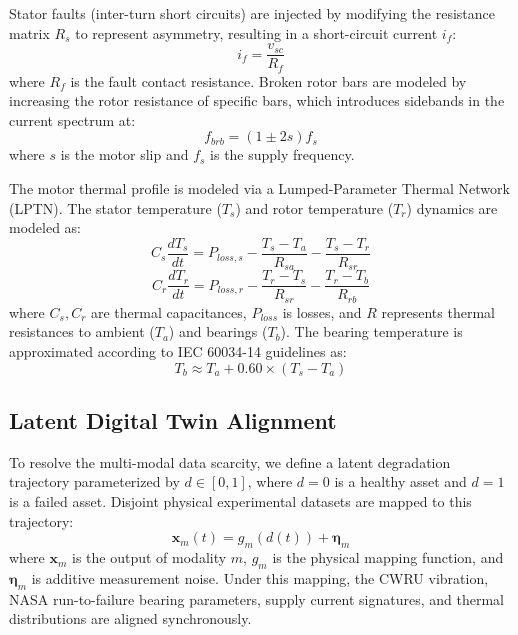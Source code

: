 \documentclass[journal]{IEEEtran}
\begin{document}
Stator faults (inter-turn short circuits) are injected by modifying the resistance matrix $R_s$ to represent asymmetry, resulting in a short-circuit current $i_f$:
\begin{equation}
i_f = \frac{v_{sc}}{R_f}
\end{equation}
where $R_f$ is the fault contact resistance. Broken rotor bars are modeled by increasing the rotor resistance of specific bars, which introduces sidebands in the current spectrum at:
\begin{equation}
f_{brb} = (1 \pm 2s)f_s
\end{equation}
where $s$ is the motor slip and $f_s$ is the supply frequency.

The motor thermal profile is modeled via a Lumped-Parameter Thermal Network (LPTN). The stator temperature ($T_s$) and rotor temperature ($T_r$) dynamics are modeled as:
\begin{equation}
C_s \frac{dT_s}{dt} = P_{loss,s} - \frac{T_s - T_a}{R_{sa}} - \frac{T_s - T_r}{R_{sr}}
\end{equation}
\begin{equation}
C_r \frac{dT_r}{dt} = P_{loss,r} - \frac{T_r - T_s}{R_{sr}} - \frac{T_r - T_b}{R_{rb}}
\end{equation}
where $C_s, C_r$ are thermal capacitances, $P_{loss}$ is losses, and $R$ represents thermal resistances to ambient ($T_a$) and bearings ($T_b$). The bearing temperature is approximated according to IEC 60034-14 guidelines as:
\begin{equation}
T_b \approx T_a + 0.60 \times (T_s - T_a)
\end{equation}

\subsection{Latent Digital Twin Alignment}
To resolve the multi-modal data scarcity, we define a latent degradation trajectory parameterized by $d \in [0, 1]$, where $d=0$ is a healthy asset and $d=1$ is a failed asset. Disjoint physical experimental datasets are mapped to this trajectory:
\begin{equation}
\mathbf{x}_m(t) = g_m(d(t)) + \mathbf{\eta}_m
\end{equation}
where $\mathbf{x}_m$ is the output of modality $m$, $g_m$ is the physical mapping function, and $\mathbf{\eta}_m$ is additive measurement noise. Under this mapping, the CWRU vibration, NASA run-to-failure bearing parameters, supply current signatures, and thermal distributions are aligned synchronously.
\end{document}
